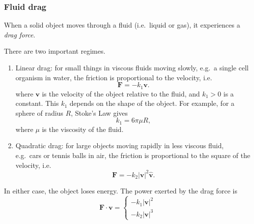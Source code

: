 \documentclass[a4paper]{article}
\begin{document}
\subsubsection*{Fluid drag}
When a solid object moves through a fluid (i.e.\ liquid or gas), it experiences a \emph{drag force}.

There are two important regimes.

\begin{enumerate}
  \item Linear drag: for small things in viscous fluids moving slowly, e.g.\ a single cell organism in water, the friction is proportional to the velocity, i.e.
    \[
      \mathbf{F} = -k_1 \mathbf{v}.
    \]
    where $\mathbf{v}$ is the velocity of the object relative to the fluid, and $k_1 > 0$ is a constant. This $k_1$ depends on the shape of the object. For example, for a sphere of radius $R$, Stoke's Law gives
    \[
      k_1 = 6\pi \mu R,
    \]
    where $\mu$ is the viscosity of the fluid.
  \item Quadratic drag: for large objects moving rapidly in less viscous fluid, e.g.\ cars or tennis balls in air, the friction is proportional to the square of the velocity, i.e.
    \[
      \mathbf{F} = -k_2|\mathbf{v}|^2\hat{\mathbf{v}}.
    \]
\end{enumerate}
In either case, the object loses energy. The power exerted by the drag force is
\[
  \mathbf{F}\cdot \mathbf{v} = \begin{cases} -k_1|\mathbf{v}|^2\\-k_2 |\mathbf{v}|^3 \end{cases}
\]
\end{document}
